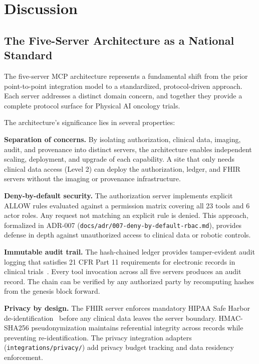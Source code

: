 \section{Discussion}
\label{sec:discussion}

\subsection{The Five-Server Architecture as a National Standard}

The five-server MCP architecture represents a fundamental shift from the prior point-to-point integration model to a standardized, protocol-driven approach. Each server addresses a distinct domain concern, and together they provide a complete protocol surface for Physical AI oncology trials.

The architecture's significance lies in several properties:

\textbf{Separation of concerns.} By isolating authorization, clinical data, imaging, audit, and provenance into distinct servers, the architecture enables independent scaling, deployment, and upgrade of each capability. A site that only needs clinical data access (Level 2) can deploy the authorization, ledger, and FHIR servers without the imaging or provenance infrastructure.

\textbf{Deny-by-default security.} The authorization server implements explicit ALLOW rules evaluated against a permission matrix covering all 23 tools and 6 actor roles. Any request not matching an explicit rule is denied. This approach, formalized in ADR-007 (\texttt{docs/adr/007-deny-by-default-rbac.md}), provides defense in depth against unauthorized access to clinical data or robotic controls.

\textbf{Immutable audit trail.} The hash-chained ledger provides tamper-evident audit logging that satisfies 21 CFR Part 11 requirements for electronic records in clinical trials~\cite{fda2003part11}. Every tool invocation across all five servers produces an audit record. The chain can be verified by any authorized party by recomputing hashes from the genesis block forward.

\textbf{Privacy by design.} The FHIR server enforces mandatory HIPAA Safe Harbor de-identification~\cite{hipaa1996} before any clinical data leaves the server boundary. HMAC-SHA256 pseudonymization maintains referential integrity across records while preventing re-identification. The privacy integration adapters (\texttt{integrations/privacy/}) add privacy budget tracking and data residency enforcement.

